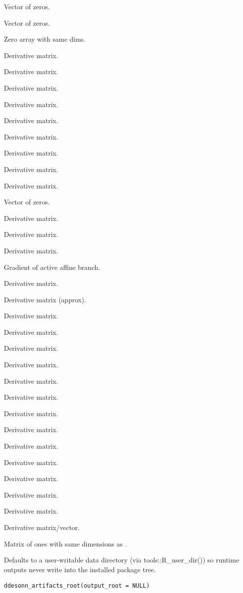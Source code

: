 \documentclass[a4paper]{book}
\begin{document}
\begin{Value}
Vector of zeros.

Vector of zeros.

Zero array with same dims.

Derivative matrix.

Derivative matrix.

Derivative matrix.

Derivative matrix.

Derivative matrix.

Derivative matrix.

Derivative matrix.

Derivative matrix.

Derivative matrix.

Vector of zeros.

Derivative matrix.

Derivative matrix.

Derivative matrix.

Gradient of active affine branch.

Derivative matrix.

Derivative matrix (approx).

Derivative matrix.

Derivative matrix.

Derivative matrix.

Derivative matrix.

Derivative matrix.

Derivative matrix.

Derivative matrix.

Derivative matrix.

Derivative matrix.

Derivative matrix.

Derivative matrix.

Derivative matrix.

Derivative matrix.

Derivative matrix/vector.

Matrix of ones with same dimensions as .
\end{Value}
%
\begin{Description}
Defaults to a user-writable data directory (via tools::R\_user\_dir()) so
runtime outputs never write into the installed package tree.
\end{Description}
%
\begin{Usage}
\begin{verbatim}
ddesonn_artifacts_root(output_root = NULL)
\end{verbatim}
\end{Usage}
\end{document}

